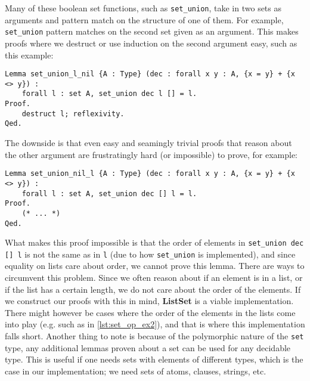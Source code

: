 Many of these boolean set functions, such as \lstinline{set_union},
take in two sets as arguments and pattern match on the structure of one of them.
For example, \lstinline{set_union} pattern matches on the second set given as an argument.
This makes proofs where we destruct or use induction on the second argument easy, such as this example:

\begin{minipage}{\linewidth}
\begin{lstlisting}[language=Coq, label={lst:set_op_ex1}, caption={Easy proof of lemma in \lstinline{ListSet} module}]
Lemma set_union_l_nil {A : Type} (dec : forall x y : A, {x = y} + {x <> y}) :
    forall l : set A, set_union dec l [] = l.
Proof.
    destruct l; reflexivity.
Qed.
\end{lstlisting}
\end{minipage}

The downside is that even easy and seamingly trivial proofs that reason about the other argument are frustratingly hard
(or impossible) to prove, for example:

\begin{minipage}{\linewidth}
\begin{lstlisting}[language=Coq, label={lst:set_op_ex2}, caption={Impossible proof of lemma in \lstinline{ListSet} module}]
Lemma set_union_nil_l {A : Type} (dec : forall x y : A, {x = y} + {x <> y}) :
    forall l : set A, set_union dec [] l = l.
Proof.
    (* ... *)
Qed.
\end{lstlisting}
\end{minipage}

What makes this proof impossible is that the order of elements in \lstinline{set_union dec [] l} is not the
same as in \lstinline{l} (due to how \lstinline{set_union} is implemented), and since equality on lists care about order,
we cannot prove this lemma.
There are ways to circumvent this problem.
Since we often reason about if an element is in a list, or if the list has a certain length,
we do not care about the order of the elements.
If we construct our proofs with this in mind, \textbf{ListSet} is a viable implementation.
There might however be cases where the order of the elements in the lists come into play (e.g. such as in \autoref{lst:set_op_ex2}),
and that is where this implementation falls short.
Another thing to note is because of the polymorphic nature of the \lstinline{set} type, any additional lemmas proven about a set can be
used for any decidable type. This is useful if one needs sets with elements of different types,
which is the case in our implementation; we need sets of atoms, clauses, strings, etc.

